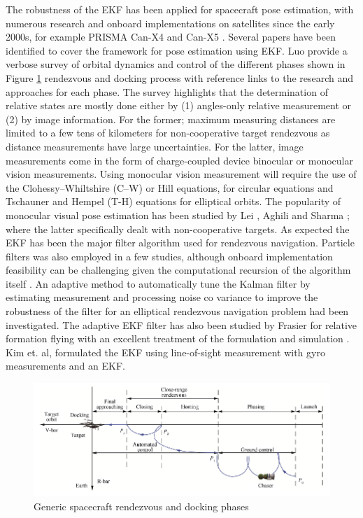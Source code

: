 The robustness of the EKF has been applied for spacecraft pose estimation, with numerous research and onboard implementations on satellites since the early 2000s, for example PRISMA \cite{dAmicoPrisma11} Can-X4 and Can-X5 \cite{boninCanX}. Several papers have been identified to cover the framework for pose estimation using EKF. Luo \cite{luoSurvey13} provide a verbose survey of orbital dynamics and control of the different phases shown in Figure \ref{fig:rendezvousPhase} rendezvous and docking process with reference links to the research and approaches for each phase. The survey highlights that the determination of relative states are mostly done either by (1) angles-only relative measurement or (2) by image information. For the former; maximum measuring distances are limited to a few tens of kilometers for non-cooperative target rendezvous as distance measurements have large uncertainties. For the latter, image measurements come in the form of charge-coupled device binocular or monocular vision measurements. Using monocular vision measurement will require the use of the Clohessy–Whiltshire (C–W) or Hill equations, for circular equations and Tschauner and Hempel (T-H) equations for elliptical orbits. The popularity of monocular visual pose estimation has been studied by Lei \cite{leiPoseSlam19}, Aghili \cite{aghiliPoseVision10} and Sharma \cite{sharmePoseNonC17a}; where the latter specifically dealt with non-cooperative targets. As expected the EKF has been the major filter algorithm used for rendezvous navigation. Particle filters was also employed in a few studies, although onboard implementation feasibility can be challenging given the computational recursion of the algorithm itself \cite{}. An adaptive method to automatically tune the Kalman filter by estimating measurement and processing noise co variance to improve the robustness of the filter for an elliptical rendezvous navigation problem had been investigated. The adaptive EKF filter has also been studied by Frasier for relative formation flying with an excellent treatment of the formulation and simulation \cite{frasierAdaptiveKF18}. Kim et. al, \cite{kimPoseGyroYY} formulated the EKF using line-of-sight measurement with gyro measurements and an EKF. 
\begin{figure}[ht]
    \centering
    \includegraphics[width=1\textwidth]{Figures/LuoSurveyOfRelativeNavigation.PNG}
    \caption{Generic spacecraft rendezvous and docking phases \cite{luoSurvey13}}
    \label{fig:rendezvousPhase}
\end{figure}

